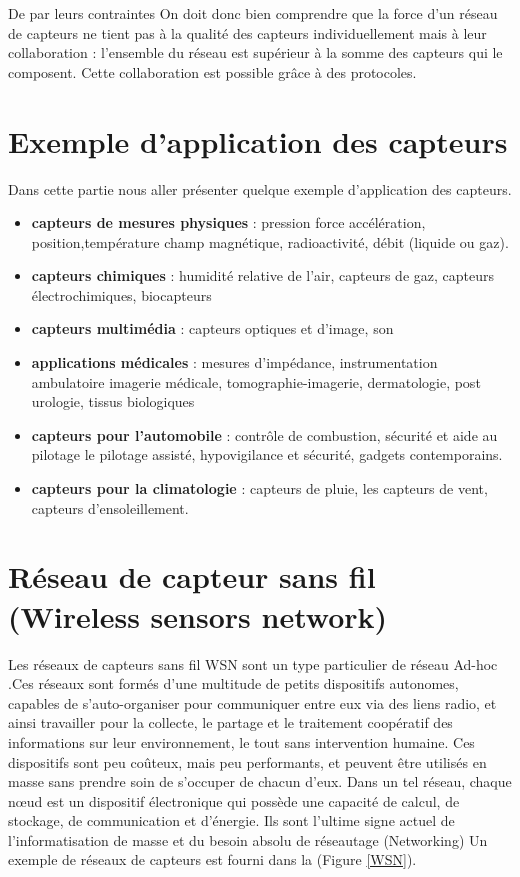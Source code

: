 De par leurs contraintes On doit donc bien comprendre que la force d’un réseau de capteurs ne tient pas à la qualité des capteurs individuellement mais à leur collaboration : l’ensemble du réseau est supérieur à la somme des capteurs qui le composent. Cette collaboration est possible grâce à des protocoles.


\section{Exemple d’application des capteurs}
Dans cette partie nous aller présenter quelque exemple d’application des capteurs.
\begin{itemize}

\item \textbf{capteurs de mesures physiques} : pression force accélération, position,température champ magnétique, radioactivité, débit (liquide ou gaz).

\item \textbf{capteurs chimiques} : humidité relative de l'air, capteurs de gaz, capteurs électrochimiques, biocapteurs

\item \textbf{capteurs multimédia} : capteurs optiques et d'image, son

\item \textbf{applications médicales} : mesures d'impédance, instrumentation ambulatoire imagerie médicale, tomographie-imagerie, dermatologie, post urologie, tissus biologiques

\item \textbf{capteurs pour l'automobile} : contrôle de combustion, sécurité et aide au pilotage le pilotage assisté, hypovigilance et sécurité, gadgets contemporains.

\item \textbf{capteurs pour la climatologie} : capteurs de pluie, les capteurs de vent, capteurs d'ensoleillement.

\end{itemize}


\section{Réseau de capteur sans fil (Wireless sensors network)}
Les réseaux de capteurs sans fil  WSN  sont un type particulier de réseau Ad-hoc .Ces réseaux sont formés d’une multitude de petits dispositifs autonomes, capables de s’auto-organiser pour communiquer entre eux via des liens radio, et ainsi travailler pour la collecte, le partage et le traitement coopératif des informations sur leur environnement, le tout sans intervention humaine. Ces dispositifs sont peu coûteux, mais peu performants, et peuvent être utilisés en masse sans prendre soin de s’occuper de chacun d’eux. Dans un tel réseau, chaque nœud est un dispositif électronique qui possède une capacité de calcul, de stockage, de communication et d’énergie. Ils sont l’ultime signe actuel de l’informatisation de masse et du besoin absolu de réseautage (Networking) Un  exemple de réseaux de capteurs est fourni  dans la  (Figure \ref{WSN}).


